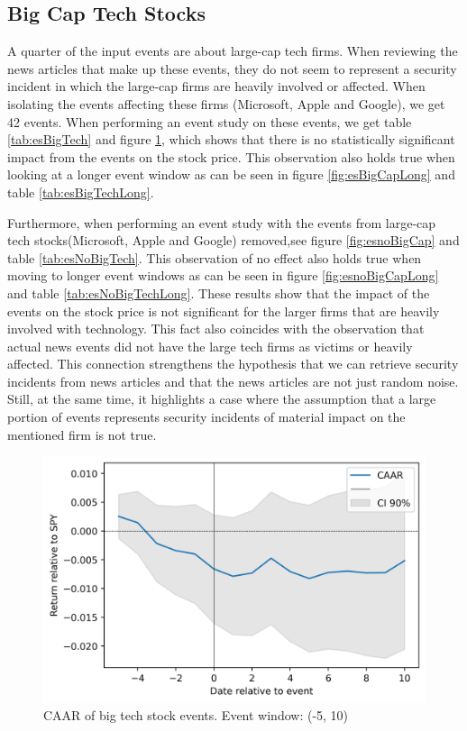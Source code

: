\subsection{Big Cap Tech Stocks}

A quarter of the input events are about large-cap tech firms. When reviewing the news articles that make up these events, they do not seem to represent a security incident in which the large-cap firms are heavily involved or affected. When isolating the events affecting these firms (Microsoft, Apple and Google), we get 42 events. When performing an event study on these events, we get table \ref{tab:esBigTech} and figure \ref{fig:esBigCap}, which shows that there is no statistically significant impact from the events on the stock price. This observation also holds true when looking at a longer event window as can be seen in figure \ref{fig:esBigCapLong} and table \ref{tab:esBigTechLong}.

Furthermore, when performing an event study with the events from large-cap tech stocks(Microsoft, Apple and Google) removed,see figure \ref{fig:esnoBigCap} and table \ref{tab:esNoBigTech}. This observation of no effect also holds true when moving to longer event windows as can be seen in figure \ref{fig:esnoBigCapLong} and table \ref{tab:esNoBigTechLong}. These results show that the impact of the events on the stock price is not significant for the larger firms that are heavily involved with technology. This fact also coincides with the observation that actual news events did not have the large tech firms as victims or heavily affected. This connection strengthens the hypothesis that we can retrieve security incidents from news articles and that the news articles are not just random noise. Still, at the same time, it highlights a case where the assumption that a large portion of events represents security incidents of material impact on the mentioned firm is not true.

\begin{figure}[h]
  \centering
  \includegraphics[width=1\textwidth]{figures/esBigCap.png}
  \caption{CAAR of big tech stock events. Event window: (-5, 10)}
  \label{fig:esBigCap}
\end{figure}


